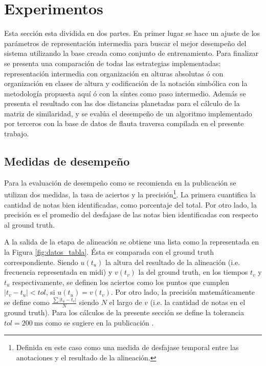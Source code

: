 \documentclass
  [ams,pdfout]%
	{aeslac}
\begin{document}
\section{Experimentos}

Esta sección esta dividida en dos partes. En primer lugar se hace un ajuste de los parámetros de representación intermedia para buscar el mejor desempeño del sistema utilizando la base creada como conjunto de entrenamiento. Para finalizar se presenta una comparación de todas las estrategias implementadas: representación intermedia con organización en alturas absolutas ó con organización en clases de altura y codificación de la notación simbólica con la metodología propuesta aquí ó con la síntes como paso intermedio. Además se presenta el resultado con las dos distancias planetadas para el cálculo de la matriz de similaridad, y se evalúa el desempeño de un algoritmo implementado por terceros con la base de datos de flauta traversa compilada en el presente trabajo.

%
\subsection{Medidas de desempeño}
\label{sec:medidas_desempeno}

Para la evaluación de desempeño como se recomienda en la publicación \cite{orio2003score} se utilizan dos medidas, la tasa de aciertos y la precisión\footnote{Definida en este caso como una medida de desfajase temporal entre las anotaciones y el resultado de la alineación.}. La primera cuantifica la cantidad de notas bien identificadas, como porcentaje del total. Por otro lado, la precisión es el promedio del desfajase de las notas bien identificadas con respecto al ground truth.

A la salida de la etapa de alineación se obtiene una lista como la representada en la Figura \ref{fig:datos_tabla}. Ésta es comparada con el ground truth correspondiente. Siendo $u(t_u)$ la altura del resultado de la alineación (i.e. frecuencia representada en midi) y $v(t_v)$ la del ground truth, en los tiempos $t_v$ y $t_u$ respectivamente, se definen los aciertos como los puntos que cumplen $|t_v-t_u|<tol$, si $u(t_u)=v(t_v)$. Por otro lado, la precisión matemáticamente se define como $\frac{\sum{|t_u-t_v|}}{N}$ siendo $N$ el largo de $v$ (i.e. la cantidad de notas en el ground truth). Para los cálculos de la presente sección se define la tolerancia $tol=200~\textrm{ms}$ como se sugiere en la publicación \cite{orio2001alignment}.
\end{document}
